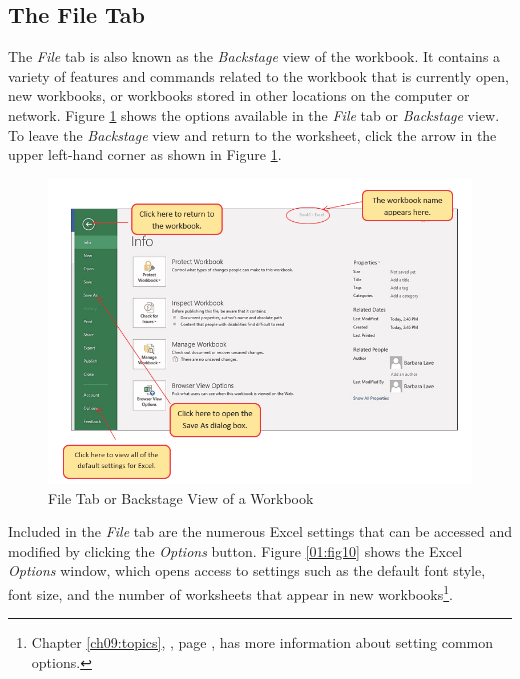 \subsection{The File Tab}

The \textit{File} tab is also known as the \textit{Backstage} view of the workbook. It contains a variety of features and commands related to the workbook that is currently open, new workbooks, or workbooks stored in other locations on the computer or network. Figure \ref{01:fig09} shows the options available in the \textit{File} tab or \textit{Backstage} view. To leave the \textit{Backstage} view and return to the worksheet, click the arrow in the upper left-hand corner as shown in Figure \ref{01:fig09}.

\begin{figure}[H]
	\centering
	\includegraphics[width=\maxwidth{.95\linewidth}]{gfx/ch01_fig09}
	\caption{File Tab or Backstage View of a Workbook}
	\label{01:fig09}
\end{figure}

Included in the \textit{File} tab are the numerous Excel settings that can be accessed and modified by clicking the \textit{Options} button. Figure \ref{01:fig10} shows the Excel \textit{Options} window, which opens access to settings such as the default font style, font size, and the number of worksheets that appear in new workbooks\footnote{Chapter \ref{ch09:topics}, , page \pageref{ch09:topics}, has more information about setting common options.}.

